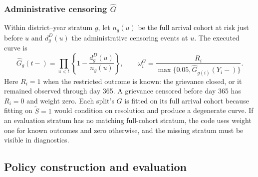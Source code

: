 \documentclass[11pt,a4paper]{article}
\theoremstyle{plain}
\theoremstyle{definition}
\theoremstyle{remark}
\newcommand{\Sproxy}{\widetilde S}
\begin{document}
\subsubsection*{Administrative censoring $\hat G$}

Within district--year stratum $g$, let $n_g(u)$ be the full arrival cohort at risk just before
$u$ and $d_g^D(u)$ the administrative censoring events at $u$. The executed curve is
\begin{equation}
\hat G_g(t-)=\prod_{u<t}\left\{1-\frac{d_g^D(u)}{n_g(u)}\right\},
\qquad
\omega_i^G=\frac{R_i}{\max\{0.05,\hat G_{g(i)}(Y_i-)\}}.
\label{eq:asrun-g}
\end{equation}
Here $R_i=1$ when the restricted outcome is known: the grievance closed, or it remained observed
through day 365. A grievance censored before day 365 has $R_i=0$ and weight zero. Each split's
$G$ is fitted on its full arrival cohort because fitting on $\Sproxy=1$ would condition on
resolution and produce a degenerate curve. If an evaluation stratum has no matching full-cohort
stratum, the code uses weight one for known outcomes and zero otherwise, and the missing stratum
must be visible in diagnostics.

\subsection{Policy construction and evaluation}
\end{document}
